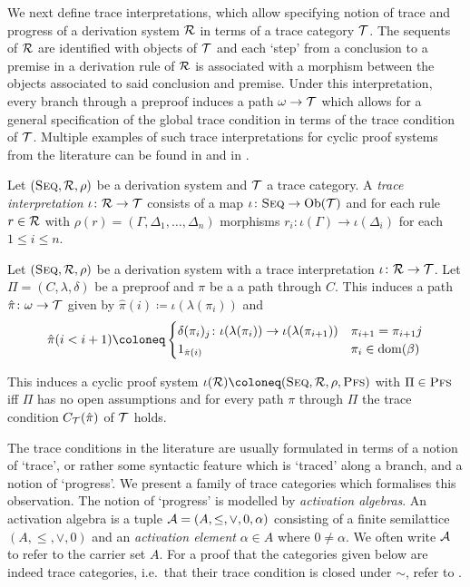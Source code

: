 We next define trace interpretations, which allow specifying notion of trace and
progress of a derivation system $\mathcal{R}$ in terms of a trace category $\mathcal{T}$. The
sequents of $\mathcal{R}$ are identified with objects of $\mathcal{T}$ and each `step' from a
conclusion to a premise in a derivation rule of $\mathcal{R}$ is associated with a
morphism between the objects associated to said conclusion and premise. Under
this interpretation, every branch through a preproof induces a path $\omega \to
\mathcal{T}$ which allows for a general specification of the global trace condition in
terms of the trace condition of $\mathcal{T}$. Multiple examples of such trace
interpretations for cyclic proof systems from the literature can be found in
 and in \cite[Chapter 6]{wehrAbstractFrameworkAnalysis2021}.

\begin{definition}
  Let $(\textsc{Seq}, \mathcal{R}, \rho)$ be a derivation system and $\mathcal{T}$ a trace category. A
  \emph{trace interpretation} $\iota \colon \mathcal{R} \to \mathcal{T}$ consists of a map $\iota \colon \textsc{Seq}
  \to \mathrm{Ob}(\mathcal{T})$ and for each rule $r \in \mathcal{R}$ with $\rho(r) = (\Gamma, \Delta_1,
  \ldots, \Delta_n)$ morphisms $r_i \colon \iota(\Gamma) \to \iota(\Delta_i)$ for each \( 1 \le i \le n \).
\end{definition}

\begin{definition}[$\iota(\RR)$]\label{def:tc-induced}
  Let $(\textsc{Seq}, \mathcal{R}, \rho)$ be a derivation system with a trace interpretation 
  \( \iota \colon \mathcal{R} \to \mathcal{T}\). Let $\Pi = (C, \lambda, \delta)$ be a preproof and $\pi$ be a a path
  through $C$. This induces a path $\hat{\pi} \colon \omega \to \mathcal{T}$ given by \(
  \hat{\pi}(i) \coloneq \iota(\lambda(\pi_i)) \) and
  \[ \hat{\pi}(i < i + 1) \coloneq
    \begin{cases}
      \delta(\pi_i)_j \colon \iota(\lambda(\pi_i)) \to \iota(\lambda(\pi_{i + 1})) & \pi_{i + 1} = \pi_{i + 1} j \\
      1_{\hat{\pi}(i)} & \pi_i \in \dom(\beta)
    \end{cases}
  \]

  This induces a cyclic proof system $\iota(\RR) \coloneq (\Seq, \RR, \rho,
  \SC)$ with $\Pi \in \textsc{Pfs}$ iff $\Pi$ has no open assumptions and for every path
  $\pi$ through $\Pi$ the trace condition $C_{\mathcal{T}}(\hat{\pi})$ of $\mathcal{T}$ holds.
\end{definition}

The trace conditions in the literature are usually formulated in terms of a
notion of `trace', or rather some syntactic feature which is `traced' along a
branch, and a notion of `progress'. We present a family of trace categories
which formalises this observation. The notion of `progress' is modelled by
\emph{activation algebras}.
An activation algebra is a tuple $\mathcal{A} = (A, \leq, \vee, 0, \alpha)$
consisting of
a finite semilattice $(A, \leq, \vee, 0)$ and an \emph{activation
  element} $\alpha \in A$ where $0 \neq \alpha$. We often write $\mathcal{A}$ to refer
to the carrier set $A$. For a proof that the categories given below are indeed trace
categories, i.e.\ that their trace condition is closed under $\sim$, refer to
\parencite[Proposition 5.9]{wehrAbstractFrameworkAnalysis2021}. 

